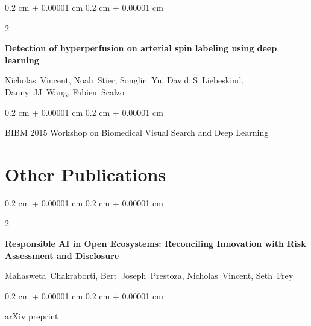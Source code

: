 \documentclass[10pt, letterpaper]{article}
\newenvironment{onecolentry}{
    \begin{adjustwidth}{
        0.2 cm + 0.00001 cm
    }{
        0.2 cm + 0.00001 cm
    }
}{
    \end{adjustwidth}
} %
\newenvironment{twocolentry}[2][]{
    \onecolentry
    \def\secondColumn{#2}
    \setcolumnwidth{\fill, 4.1 cm}
    \begin{paracol}{2}
}{
    \switchcolumn \raggedleft \secondColumn
    \end{paracol}
    \endonecolentry
} %
\begin{document}
        \vspace{0.2 cm}

        \begin{samepage}
            \begin{twocolentry}{
                2015
            }
                \textbf{Detection of hyperperfusion on arterial spin labeling using deep learning}

                \vspace{0.10 cm}

                \mbox{Nicholas Vincent}, \mbox{Noah Stier}, \mbox{Songlin Yu}, \mbox{David S Liebeskind}, \mbox{Danny JJ Wang}, \mbox{Fabien Scalzo}
            \end{twocolentry}


            \vspace{0.10 cm}

            \begin{onecolentry}
        BIBM 2015 Workshop on Biomedical Visual Search and Deep Learning    \end{onecolentry}
        \end{samepage}


    
    \section{Other Publications}



        
        \begin{samepage}
            \begin{twocolentry}{
                2024
            }
                \textbf{Responsible AI in Open Ecosystems: Reconciling Innovation with Risk Assessment and Disclosure}

                \vspace{0.10 cm}

                \mbox{Mahasweta Chakraborti}, \mbox{Bert Joseph Prestoza}, \mbox{Nicholas Vincent}, \mbox{Seth Frey}
            \end{twocolentry}


            \vspace{0.10 cm}

            \begin{onecolentry}
        arXiv preprint    \end{onecolentry}
        \end{samepage}

        \vspace{0.2 cm}
\end{document}
